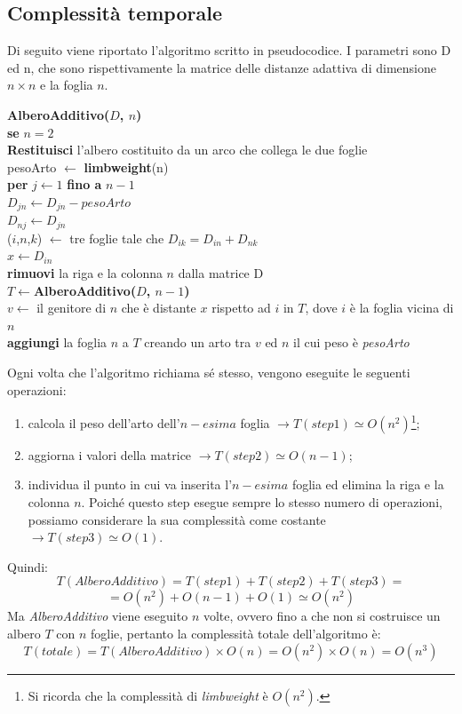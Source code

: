 \newpage
\subsection{Complessità temporale}
Di seguito viene riportato l'algoritmo scritto in pseudocodice. I parametri sono D ed n, che sono rispettivamente la matrice delle distanze adattiva di dimensione $n \times n$ e la foglia $n$.

\begin{framed}\noindent
  \textbf{AlberoAdditivo($D$, $n$)}\\
  \textbf{se} $n=2$\\
  \indent \textbf{Restituisci} l'albero costituito da un arco che collega le due foglie\\
  pesoArto $\leftarrow$ \textbf{limbweight}(n)\\
  \textbf{per} $j \leftarrow 1$ \textbf{fino a} $n-1$\\
  \indent $D_{jn} \leftarrow D_{jn} - pesoArto$\\
  \indent $D_{nj} \leftarrow D_{jn}$\\
  ($i$,$n$,$k$) $\leftarrow$ tre foglie tale che $D_{ik}=D_{in}+D_{nk}$\\
  $x \leftarrow D_{in}$\\
  \textbf{rimuovi} la riga e la colonna $n$ dalla matrice D \\
  $T \leftarrow $\textbf{AlberoAdditivo($D$, $n-1$)}\\
  $v \leftarrow $ il genitore di $n$ che è distante $x$ rispetto ad $i$ in $T$, dove $i$ è la foglia vicina di $n$\\
  \textbf{aggiungi} la foglia $n$ a $T$ creando un arto tra $v$ ed $n$ il cui peso è \textit{pesoArto}
\end{framed}
Ogni volta che l'algoritmo richiama sé stesso, vengono eseguite le seguenti operazioni:
\begin{enumerate}
	\item calcola il peso dell'arto dell'$n-esima$ foglia $\rightarrow T(step 1) \simeq O(n^2)$\footnote{Si ricorda che la complessità di \textit{limbweight} è $O(n^2)$.};
	\item aggiorna i valori della matrice $\rightarrow T(step 2) \simeq O(n-1)$;
	\item individua il punto in cui va inserita l'$n-esima$ foglia ed elimina la riga e la colonna $n$. Poiché questo step esegue sempre lo stesso numero di operazioni, possiamo considerare la sua complessità come costante $\rightarrow  T(step 3) \simeq O(1)$.  
\end{enumerate} 
Quindi:
\[T(AlberoAdditivo)=T(step 1)+T(step 2)+T(step 3)=\]
\[=O(n^2)+O(n-1)+O(1) \simeq O(n^2)\]
Ma \textit{AlberoAdditivo} viene eseguito $n$ volte, ovvero fino a che non si costruisce un albero $T$ con $n$ foglie, pertanto la complessità totale dell'algoritmo è:
\[T(totale)=T(AlberoAdditivo) \times O(n)=O(n^2) \times O(n)= O(n^3)\]
